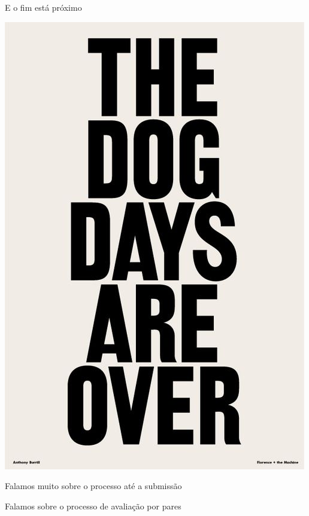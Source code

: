 \documentclass{beamer}
\begin{document}
\begin{frame}{E o fim está próximo}
  \begin{center}
    \includegraphics[height=.75\textheight]{Encerramento/dogdaysareover}

    \vfill
  \end{center}
\end{frame}

\begin{frame}
  \begin{center}
    Falamos muito sobre o processo até a submissão

  \end{center}
\end{frame}

\begin{frame}
  \begin{center}
    Falamos sobre o processo de avaliação por pares

  \end{center}
\end{frame}
\end{document}
